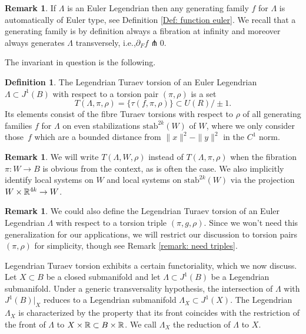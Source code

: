 \documentclass[11pt]{article}
\newcommand{\ie}{i.e.,\xspace}
\numberwithin{equation}{section}\providecommand{\dpl}{\displaystyle}
\newcommand{\stab}{\mathrm{stab}}
\theoremstyle{plain}
\theoremstyle{definition}
\newtheorem{definition}[theorem]{Definition}
\newtheorem{remark}[theorem]{Remark}
\begin{document}
\begin{remark} If $\Lambda$ is an Euler Legendrian then any generating family $f$ for $\Lambda$ is automatically of Euler type, see Definition \ref{Def: function euler}. We recall that a generating family is by definition always a fibration at infinity and moreover always generates $\Lambda$ transversely, \ie $\partial_F f \pitchfork 0$.
\end{remark}

The invariant in question is the following.

\begin{definition}
The Legendrian Turaev torsion of an Euler Legendrian $\Lambda\!\subset\!J^1(B)$ with respect to a torsion pair $(\pi, \rho)$ is a set
\[
T(\Lambda, \pi, \rho) = \{ \tau(f, \pi, \rho) \} \subset U(R) / \pm 1.
\]
Its elements consist of the fibre Turaev torsions with respect to $\rho$ of all generating families $f$ for $\Lambda$ on even stabilizations $\stab ^{2k}(W)$ of $W$, where we only consider those~$f$ which are a bounded distance from $\|x\|^2-\|y\|^2$ in the $C^1$ norm.
\end{definition}

\begin{remark}
We will write $T(\Lambda, W, \rho)$ instead of $T(\Lambda, \pi, \rho)$ when the fibration $\pi : W \to B$ is obvious from the context, as is often the case. We also implicitly identify local systems on $W$ and local systems on $\stab ^{2k}(W)$ via the projection $W \times \mathbb{R}^{4k} \to W$.
\end{remark}

\begin{remark}
We could also define the Legendrian Turaev torsion of an Euler Legendrian $\Lambda$ with respect to a torsion triple $(\pi, g, \rho)$. Since we won't need this generalization for our applications, we will restrict our discussion to torsion pairs $(\pi, \rho)$ for simplicity, though see Remark \ref{remark: need triples}.
\end{remark}

Legendrian Turaev torsion exhibits a certain functoriality, which we now discuss. Let $X \subset B$ be a closed submanifold and let $\Lambda \subset J^1(B)$ be a Legendrian submanifold. Under a generic transversality hypothesis, the intersection of $\Lambda$ with $J^1(B)|_X$ reduces to a Legendrian submanifold $\Lambda_X \subset J^1(X)$. The Legendrian $\Lambda_X$ is characterized by the property that its front coincides with the restriction of the front of $\Lambda$ to $X \times \mathbb{R} \subset B \times \mathbb{R}$. We call $\Lambda_X$ the reduction of $\Lambda$ to $X$.
\end{document}
